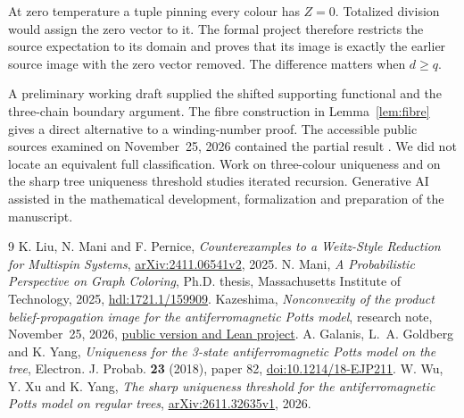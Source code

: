 \documentclass[11pt,reqno]{amsart}
\begin{document}
At zero temperature a tuple pinning every colour has $Z=0$. Totalized division would assign the zero vector to it. The formal project therefore restricts the source expectation to its domain and proves that its image is exactly the earlier source image with the zero vector removed. The difference matters when $d\ge q$.

A preliminary working draft supplied the shifted supporting functional and the three-chain boundary argument. The fibre construction in Lemma~\ref{lem:fibre} gives a direct alternative to a winding-number proof. The accessible public sources examined on November~25, 2026 contained the partial result \cite{Short}. We did not locate an equivalent full classification. Work on three-colour uniqueness \cite{GGY} and on the sharp tree uniqueness threshold \cite{WXY} studies iterated recursion. Generative AI assisted in the mathematical development, formalization and preparation of the manuscript.

\begin{thebibliography}{9}
 K. Liu, N. Mani and F. Pernice, \emph{Counterexamples to a Weitz-Style Reduction for Multispin Systems}, \href{https://arxiv.org/abs/2411.06541v2}{arXiv:2411.06541v2}, 2025.
 N. Mani, \emph{A Probabilistic Perspective on Graph Coloring}, Ph.D. thesis, Massachusetts Institute of Technology, 2025, \href{https://dspace.mit.edu/handle/1721.1/159909}{hdl:1721.1/159909}.
 Kazeshima, \emph{Nonconvexity of the product belief-propagation image for the antiferromagnetic Potts model}, research note, November~25, 2026, \href{https://github.com/Kazeshima/solved-problems/tree/22864a3858ae02109d70c5743de1ec145113cc0b/problems/potts-bp-nonconvexity}{public version and Lean project}.
 A. Galanis, L.~A. Goldberg and K. Yang, \emph{Uniqueness for the 3-state antiferromagnetic Potts model on the tree}, Electron. J. Probab. \textbf{23} (2018), paper 82, \href{https://doi.org/10.1214/18-EJP211}{doi:10.1214/18-EJP211}.
 W. Wu, Y. Xu and K. Yang, \emph{The sharp uniqueness threshold for the antiferromagnetic Potts model on regular trees}, \href{https://arxiv.org/abs/2611.32635v1}{arXiv:2611.32635v1}, 2026.
\end{thebibliography}
\end{document}
